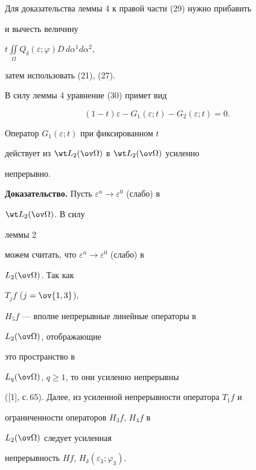  


Для доказательства леммы 4 к правой части (29) нужно прибавить 


и вычесть величину 


$t\iint\limits_\Omega Q_\delta(\varepsilon;\varphi)D\, 


d\alpha^1d\alpha^2$, 


затем использовать (21), (27). 


 


В силу леммы 4 уравнение (30) примет вид 


\begin{equation} 


(1-t)\varepsilon-G_1(\varepsilon;t)-G_2(\varepsilon;t)=0. 


\end{equation} 


 


\begin{thm} Оператор $G_1(\varepsilon;t)$ при фиксированном $t$ 


действует из $\wt L_2(\ov\Omega)$ в $\wt L_2(\ov\Omega)$ усиленно 


непрерывно. 


\end{thm} 


 


{\bf Доказательство.} Пусть $\varepsilon^n\to\varepsilon^0$ (слабо) в 


$\wt L_2(\ov\Omega)$. В силу 


леммы 2 


можем считать, что $\varepsilon^n\to\varepsilon^0$ (слабо) в 


$L_2(\ov\Omega)$. Так как 


$T_jf$ ($j=\ov{1,3}$), 


$H_5f$ --- вполне непрерывные линейные операторы в 


$L_2(\ov\Omega)$, отображающие 


это пространство в 


$L_q(\ov\Omega)$, $q\ge 1$, то они усиленно непрерывны 


([1], с.\,65). Далее, из усиленной непрерывности оператора $T_1f$ и 


ограниченности операторов $H_3f$, $H_4f$ в 


$L_2(\ov\Omega)$ следует усиленная 


непрерывность $Hf$, $H_\delta(\varepsilon_3;\varphi_3)$. 


